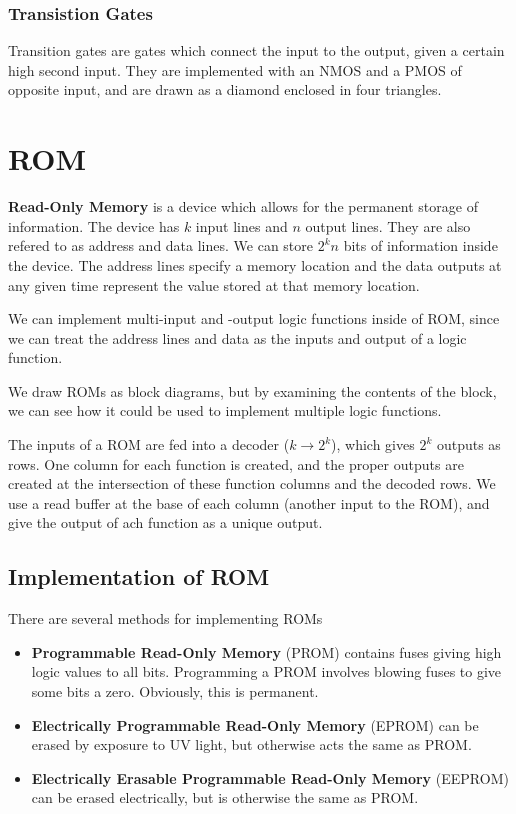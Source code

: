 \documentclass[12pt]{article}
\begin{document}
\subsubsection*{Transistion Gates}
Transition gates are gates which connect the input to the output, given a certain high second input. They are implemented with an NMOS and a PMOS of opposite input, and are drawn as a diamond enclosed in four triangles.

\section*{ROM}
{\bf Read-Only Memory} is a device which allows for the permanent storage of information. The device has $k$ input lines and $n$ output lines. They are also refered to as address and data lines. We can store $2^kn$ bits of information inside the device. The address lines specify a memory location and the data outputs at any given time represent the value stored at that memory location.

We can implement multi-input and -output logic functions inside of ROM, since we can treat the address lines and data as the inputs and output of a logic function.

We draw ROMs as block diagrams, but by examining the contents of the block, we can see how it could be used to implement multiple logic functions.

The inputs of a ROM are fed into a decoder ($k \to 2^k$), which gives $2^k$ outputs as rows. One column for each function is created, and the proper outputs are created at the intersection of these function columns and the decoded rows. We use a read buffer at the base of each column (another input to the ROM), and give the output of ach function as a unique output.

\subsection*{Implementation of ROM}
There are several methods for implementing ROMs
\begin{itemize}
\item {\bf Programmable Read-Only Memory} (PROM) contains fuses giving high logic values to all bits. Programming a PROM involves blowing fuses to give some bits a zero. Obviously, this is permanent.
\item {\bf Electrically Programmable Read-Only Memory} (EPROM) can be erased by exposure to UV light, but otherwise acts the same as PROM.
\item {\bf Electrically Erasable Programmable Read-Only Memory} (EEPROM) can be erased electrically, but is otherwise the same as PROM.
\end{itemize}
\end{document}
